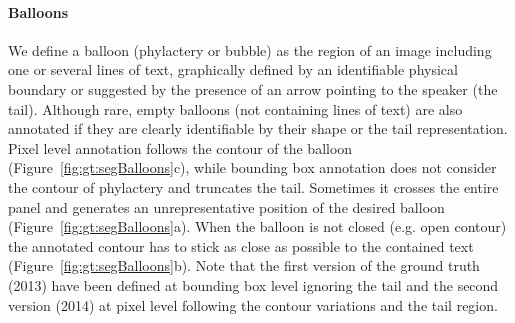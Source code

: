 

\paragraph{Balloons} %
\label{par:balloons}
We define a balloon (phylactery or bubble) as the region of an image including one or several lines of text, graphically defined by an identifiable physical boundary or suggested by the presence of an arrow pointing to the speaker (the tail).
Although rare, empty balloons (not containing lines of text) are also annotated if they are clearly identifiable by their shape or
the tail representation.
Pixel level annotation follows the contour of the balloon (Figure~\ref{fig:gt:segBalloons}c), while bounding box annotation does not consider the contour of phylactery and truncates the tail.
Sometimes it crosses the entire panel and generates an unrepresentative position of the desired balloon (Figure~\ref{fig:gt:segBalloons}a).
When the balloon is not closed (e.g. open contour) the annotated contour has to stick as close as possible to the contained text (Figure~\ref{fig:gt:segBalloons}b).
Note that the first version of the ground truth (2013) have been defined at bounding box level ignoring the tail and the second version (2014) at pixel level following the contour variations and the tail region.

